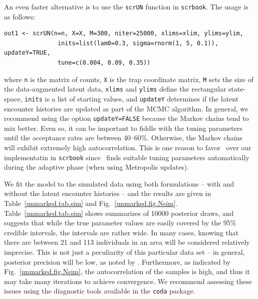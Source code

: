 An even faster alternative is to use the \verb+scrUN+ function in
\texttt{scrbook}.
The usage is as follows:
\begin{verbatim}
out1 <- scrUN(n=n, X=X, M=300, niter=25000, xlims=xlim, ylims=ylim,
               inits=list(lam0=0.3, sigma=rnorm(1, 5, 0.1)), updateY=TRUE,
               tune=c(0.004, 0.09, 0.35))
\end{verbatim}
where \verb+n+ is the matrix of counts, \verb+X+ is the trap
coordinate matrix, \verb+M+ sets the size of the data-augmented latent
data, \verb+xlims+ and \verb+ylims+ define the
rectangular state-space, \verb+inits+ is a list of starting values,
and \verb+updateY+ determines if the latent encounter histories are
updated as part of the MCMC algorithm. In general, %
we recommend using the option
\verb+updateY=FALSE+ because the Markov chains tend to mix
better. %
Even so, it can be important to fiddle with the tuning parameters until the
acceptance rates are between 40--60\%. Otherwise, the Markov chains
will exhibit extremely high autocorrelation. This is one reason to favor
\jags~over our implementatin in \texttt{scrbook} since \jags~finds
suitable tuning parameters automatically during the adaptive phase
(when using Metropolis updates).

We fit the model to the simulated data using both formulations -- with and without
the latent encounter histories -- %
and the results
are given in Table~\ref{unmarked.tab.sim} and
Fig.~\ref{unmarked.fig.Nsim}.
Table~\ref{unmarked.tab.sim} shows %
summarizes of 10000 posterior draws, and suggests that while the
true parameter values are easily covered by the 95\% credible
intervals, the intervals are rather wide. In many cases, knowing that
there are between 21 and 113 individuals in an area will be considered
relatively imprecise.
This is not just a
peculiarity of this particular data set -- in general, posterior
precision will be low, as noted by
\citet{chandler_royle:2012}. Furthermore,
as indicated by
Fig.~\ref{unmarked.fig.Nsim}, the autocorrelation of the samples is
high, and thus it may take
many iterations to achieve convergence. We recommend assessing these
issues using the diagnostic tools available in the \texttt{coda} package.

